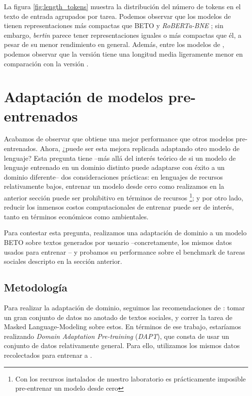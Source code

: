 La figura \ref{fig:length_tokens} muestra la distribución del número de tokens en el texto de entrada agrupados por tarea. Podemos observar que los modelos de \robertuito{} tienen representaciones más compactas que BETO  y \emph {RoBERTa-BNE} ; sin embargo, \emph{bertin} parece tener representaciones iguales o más compactas que él, a pesar de su menor rendimiento en general. Además, entre los modelos de \robertuito{}, podemos observar que la versión \deacc{} tiene una longitud media ligeramente menor en comparación con la versión \uncased{}.


\section{Adaptación de modelos pre-entrenados}
\label{sec:domain_adaptation_vs_robertuito}

Acabamos de observar que \robertuito{} obtiene una mejor performance que otros modelos pre-entrenados. Ahora, ¿puede ser esta mejora replicada adaptando otro modelo de lenguaje? Esta pregunta tiene --más allá del interés teórico de si un modelo de lenguaje entrenado en un dominio distinto puede adaptarse con éxito a un dominio diferente-- dos consideraciones prácticas: en lenguajes de recursos relativamente bajos, entrenar un modelo desde cero como realizamos en la anterior sección puede ser prohibitivo en términos de recursos \footnote{Con los recursos instalados de nuestro laboratorio es prácticamente imposible pre-entrenar un modelo desde cero}; y por otro lado, reducir los inmensos costos computacionales de entrenar puede ser de interés, tanto en términos económicos como ambientales.

Para contestar esta pregunta, realizamos una adaptación de dominio a un modelo BETO sobre textos generados por usuario --concretamente, los mismos datos usados para entrenar \robertuito{}-- y probamos su performance sobre el benchmark de tareas sociales descripto en la sección anterior.


\subsection{Metodología}

Para realizar la adaptación de dominio, seguimos las recomendaciones de \citet{gururangan-etal-2020-dont}: tomar un gran conjunto de datos no anotado de textos sociales, y correr la tarea de Masked Language-Modeling sobre estos. En términos de ese trabajo, estaríamos realizando \emph{Domain Adaptation Pre-training} (\emph{DAPT}), que consta de usar un conjunto de datos relativamente general. Para ello, utilizamos los mismos datos recolectados para entrenar a \robertuito{}.

